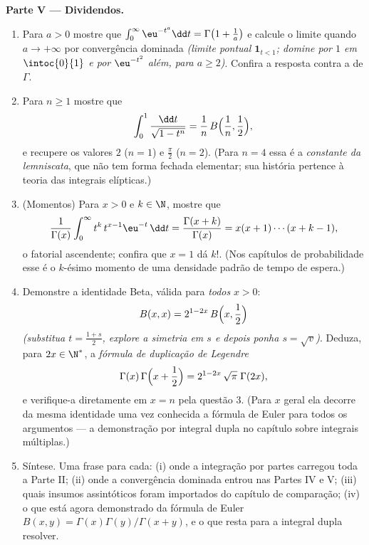 \begin{problem}
\medskip
\noindent\textbf{Parte V --- Dividendos.}
\begin{enumerate}[resume]
  \item Para $a > 0$ mostre que $\int_0^\infty \eu^{-t^a}\dd t =
        \Gamma\bigl(1 + \frac1a\bigr)$ e calcule o limite quando
        $a \to +\infty$ por convergência dominada \emph{(limite
        pontual $\mathbf 1_{t < 1}$; domine por $1$ em
        $\intoc{0}{1}$ e por $\eu^{-t^2}$ além, para $a \geq
        2$)}. Confira a resposta contra a  de
        $\Gamma$.
  \item Para $n \geq 1$ mostre que
        \[
        \int_0^1 \frac{\dd t}{\sqrt{1 - t^n}}
        = \frac1n\,B\Bigl(\frac1n, \frac12\Bigr),
        \]
        e recupere os valores $2$ ($n = 1$) e $\frac\pi2$ ($n
        = 2$). (Para $n = 4$ essa é a \emph{constante da
        lemniscata}, que não tem forma fechada elementar; sua
        história pertence à teoria das integrais elípticas.)
  \item (Momentos) Para $x > 0$ e $k \in \N$, mostre que
        \[
        \frac{1}{\Gamma(x)}\int_0^\infty
        t^{k}\,t^{x-1}\eu^{-t}\,\dd t
        = \frac{\Gamma(x+k)}{\Gamma(x)}
        = x(x+1)\cdots(x+k-1),
        \]
        o fatorial ascendente; confira que $x = 1$ dá $k!$. (Nos
        capítulos de probabilidade esse é o $k$-ésimo momento de uma
        densidade padrão de tempo de espera.)
  \item Demonstre a identidade Beta, válida para \emph{todos} $x > 0$:
        \[
        B(x, x) = 2^{1-2x}\,B\Bigl(x, \frac12\Bigr)
        \]
        \emph{(substitua $t = \frac{1+s}2$, explore a
        simetria em $s$ e depois ponha $s = \sqrt v$)}. Deduza, para
        $2x \in \N^*$, a \emph{fórmula de duplicação de Legendre}
        \[
        \Gamma(x)\,\Gamma\Bigl(x + \frac12\Bigr)
        = 2^{1-2x}\,\sqrt\pi\;\Gamma(2x),
        \]
        e verifique-a diretamente em $x = n$ pela questão 3. (Para
        $x$ geral ela decorre da mesma identidade uma vez
        conhecida a fórmula de Euler para todos os argumentos --- a
        demonstração por integral dupla no capítulo sobre integrais
        múltiplas.)
  \item Síntese. Uma frase para cada: (i) onde a integração
        por partes carregou toda a Parte II; (ii) onde a
        convergência dominada entrou nas Partes IV e V; (iii) quais
        insumos assintóticos foram importados do capítulo de
        comparação; (iv) o que está agora demonstrado da fórmula de Euler
        $B(x,y) = \Gamma(x)\Gamma(y)/\Gamma(x+y)$, e o que
        resta para a integral dupla resolver.
\end{enumerate}
\end{problem}
